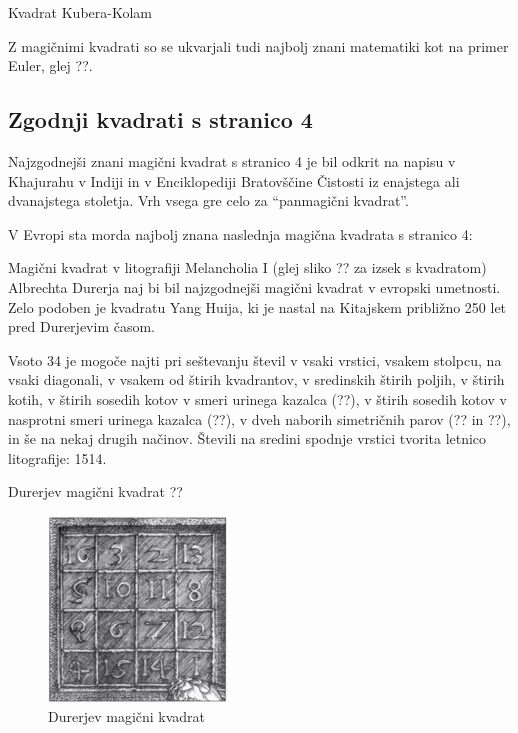 \documentclass[a4paper,12pt]{article}
\begin{document}
Kvadrat Kubera-Kolam

Z magičnimi kvadrati so se ukvarjali tudi najbolj znani matematiki kot na
primer Euler, glej ??.

\subsection{Zgodnji kvadrati s stranico 4}


Najzgodnejši znani magični kvadrat s stranico 4 je bil odkrit na napisu
v Khajurahu v Indiji in v Enciklopediji Bratovščine Čistosti iz enajstega
ali dvanajstega stoletja. Vrh vsega gre celo za "`panmagični kvadrat"'.

V Evropi sta morda najbolj znana naslednja magična kvadrata s stranico 4:

Magični kvadrat v litografiji Melancholia I (glej sliko ??
za izsek s kvadratom) Albrechta Durerja naj bi bil najzgodnejši magični kvadrat
v evropski umetnosti. Zelo podoben je kvadratu Yang Huija, ki je nastal na Kitajskem
približno 250 let pred Durerjevim časom.

Vsoto 34 je mogoče najti pri seštevanju števil v vsaki vrstici, vsakem stolpcu,
na vsaki diagonali, v vsakem od štirih kvadrantov, v sredinskih štirih poljih,
v štirih kotih, v štirih sosedih kotov v smeri urinega kazalca (??), v
štirih sosedih kotov v nasprotni smeri urinega kazalca (??), v dveh naborih
simetričnih parov (?? in ??), in še na nekaj drugih načinov.
Števili na sredini spodnje vrstici tvorita letnico litografije: 1514.

Durerjev magični kvadrat ??

\begin{figure}[!h]
\centering
\caption{Durerjev magični kvadrat}
\vspace{2mm}
\label{durer}
\includegraphics[scale = 1.3]{durer.jpg}

\end{figure}
\end{document}
